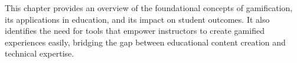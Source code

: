 This chapter provides an overview of the foundational concepts of gamification, its applications in education, and its impact on student outcomes. It also identifies the need for tools that empower instructors to create gamified experiences easily, bridging the gap between educational content creation and technical expertise.

